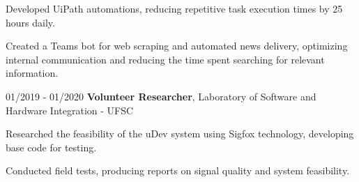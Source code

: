 	\begin{onecolentry}
		\begin{highlights}
			\item Developed UiPath automations, reducing repetitive task execution times by 25 hours daily.
			\item Created a Teams bot for web scraping and automated news delivery, optimizing internal communication and reducing the time spent searching for relevant information.
		\end{highlights}
	\end{onecolentry}

	\begin{twocolentry}{01/2019 - 01/2020}
		\textbf{Volunteer Researcher}, Laboratory of Software and Hardware Integration - UFSC
	\end{twocolentry}

	\begin{onecolentry}
		\begin{highlights}
			\item Researched the feasibility of the uDev system using Sigfox technology, developing base code for testing.
			\item Conducted field tests, producing reports on signal quality and system feasibility.
		\end{highlights}
	\end{onecolentry}